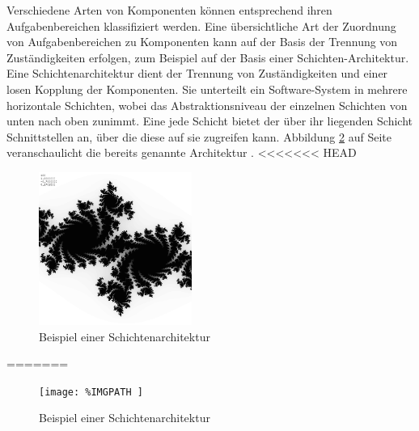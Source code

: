 Verschiedene Arten von Komponenten können entsprechend ihren Aufgabenbereichen klassifiziert werden. Eine übersichtliche Art der Zuordnung von Aufgabenbereichen zu Komponenten kann auf der Basis der Trennung von Zuständigkeiten erfolgen, zum Beispiel auf der Basis einer Schichten-Architektur. Eine Schichtenarchitektur dient der Trennung von Zuständigkeiten und einer losen Kopplung der Komponenten. Sie unterteilt ein Software-System in mehrere horizontale Schichten, wobei das Abstraktionsniveau der einzelnen Schichten von unten nach oben zunimmt. Eine jede Schicht bietet der über ihr liegenden Schicht Schnittstellen an, über die diese auf sie zugreifen kann. Abbildung \ref{fig:2_Schichtenarchitektur} auf Seite \pageref{fig:2_Schichtenarchitektur} veranschaulicht die bereits genannte Architektur \citereset \autocite{Andresen.2003}.
<<<<<<< HEAD
\begin{figure}[h]
\centering
\includegraphics[height=5.0cm]{images/Julia-Fractal.png}
\caption[
Beispiel einer Schichtenarchitektur, Urldate: 04.2014 \newline
\small\texttt{http://upload.wikimedia.org/wikipedia/commons/e/e1/SchichtenarchitekturAufrufstrukturen.svg}
]{Beispiel einer Schichtenarchitektur}
\label{fig:2_Schichtenarchitektur}
\end{figure}





=======
 \begin{figure}[h]
  \centering
  \texttt{[image: 
    \%IMGPATH
  ]}
  \caption[
    Beispiel einer Schichtenarchitektur
  ]{
    Beispiel einer Schichtenarchitektur
  }
  \label{fig:2_Schichtenarchitektur}
\end{figure}


